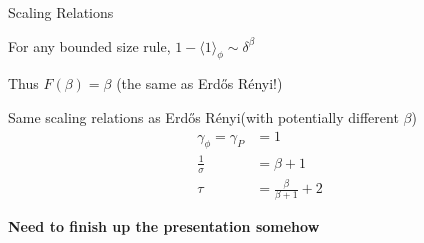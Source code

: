 \documentclass{beamer}
\newcommand{\ang}[1]{\langle #1 \rangle}
\newcommand{\warn}[1]{\textbf{\color{red}#1}}
\newcommand{\ER}{Erd\H{o}s R\'enyi\xspace}
\newcommand{\nl}{
\vspace{5mm}

}
\begin{document}
\begin{frame}{Scaling Relations}
	
	For any bounded size rule, $1 - \ang{1}_{\phi} \sim \delta^{\beta}$ \nl

	Thus $F(\beta) = \beta$ (the same as \ER!) \nl

	Same scaling relations as \ER (with potentially different $\beta$)
	\begin{align*}
                \gamma_{\phi} = \gamma_{P} &= 1 \\
                \frac{1}{\sigma} &= \beta + 1 \\
                \tau &= \frac{\beta}{\beta + 1} + 2
        \end{align*}
\end{frame}

\begin{frame}
	
	\warn{Need to finish up the presentation somehow}
\end{frame}
\end{document}
